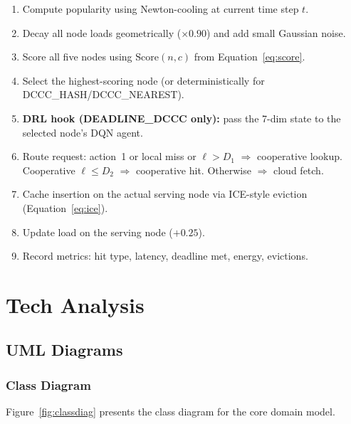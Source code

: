 \documentclass[12pt,a4paper]{report}
\begin{document}
\begin{enumerate}
  \item Compute popularity using Newton-cooling at current time step $t$.
  \item Decay all node loads geometrically ($\times 0.90$) and add small Gaussian noise.
  \item Score all five nodes using $\text{Score}(n,c)$ from Equation~\ref{eq:score}.
  \item Select the highest-scoring node (or deterministically for DCCC\_HASH/DCCC\_NEAREST).
  \item \textbf{DRL hook (DEADLINE\_DCCC only):} pass the 7-dim state to the selected
        node's DQN agent.
  \item Route request: action~1 or local miss or $\ell > D_1$ $\Rightarrow$ cooperative
        lookup. Cooperative $\ell \leq D_2$ $\Rightarrow$ cooperative hit. Otherwise $\Rightarrow$
        cloud fetch.
  \item Cache insertion on the actual serving node via ICE-style eviction
        (Equation~\ref{eq:ice}).
  \item Update load on the serving node ($+0.25$).
  \item Record metrics: hit type, latency, deadline met, energy, evictions.
\end{enumerate}

\clearpage


\chapter{Tech Analysis}
\label{ch:tech}

\section{UML Diagrams}

\subsection{Class Diagram}

Figure~\ref{fig:classdiag} presents the class diagram for the core domain model.
\end{document}
